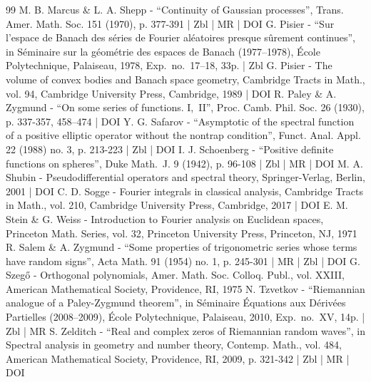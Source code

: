 \documentclass[10pt]{amsart}
\theoremstyle{theorem}
\theoremstyle{definition}
\begin{document}
\begin{thebibliography}{99}
M. B. Marcus \& L. A. Shepp - “Continuity of Gaussian processes”, Trans. Amer. Math. Soc. 151 (1970), p. 377-391 | Zbl | MR | DOI
G. Pisier - “Sur l’espace de Banach des séries de Fourier aléatoires presque sûrement continues”, in Séminaire sur la géométrie des espaces de Banach (1977–1978), École Polytechnique, Palaiseau, 1978, Exp. no. 17–18, 33p. | Zbl
G. Pisier - The volume of convex bodies and Banach space geometry, Cambridge Tracts in Math., vol. 94, Cambridge University Press, Cambridge, 1989 | DOI
R. Paley \& A. Zygmund - “On some series of functions. I, II”, Proc. Camb. Phil. Soc. 26 (1930), p. 337-357, 458–474 | DOI
Y. G. Safarov - “Asymptotic of the spectral function of a positive elliptic operator without the nontrap condition”, Funct. Anal. Appl. 22 (1988) no. 3, p. 213-223 | Zbl | DOI
I. J. Schoenberg - “Positive definite functions on spheres”, Duke Math. J. 9 (1942), p. 96-108 | Zbl | MR | DOI
M. A. Shubin - Pseudodifferential operators and spectral theory, Springer-Verlag, Berlin, 2001 | DOI
C. D. Sogge - Fourier integrals in classical analysis, Cambridge Tracts in Math., vol. 210, Cambridge University Press, Cambridge, 2017 | DOI
E. M. Stein \& G. Weiss - Introduction to Fourier analysis on Euclidean spaces, Princeton Math. Series, vol. 32, Princeton University Press, Princeton, NJ, 1971
R. Salem \& A. Zygmund - “Some properties of trigonometric series whose terms have random signs”, Acta Math. 91 (1954) no. 1, p. 245-301 | MR | Zbl | DOI
G. Szegő - Orthogonal polynomials, Amer. Math. Soc. Colloq. Publ., vol. XXIII, American Mathematical Society, Providence, RI, 1975
N. Tzvetkov - “Riemannian analogue of a Paley-Zygmund theorem”, in Séminaire Équations aux Dérivées Partielles (2008–2009), École Polytechnique, Palaiseau, 2010, Exp. no. XV, 14p. | Zbl | MR
S. Zelditch - “Real and complex zeros of Riemannian random waves”, in Spectral analysis in geometry and number theory, Contemp. Math., vol. 484, American Mathematical Society, Providence, RI, 2009, p. 321-342 | Zbl | MR | DOI
\end{thebibliography}
\end{document}
